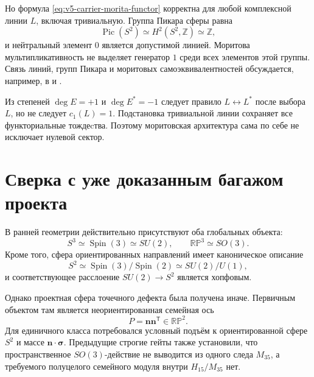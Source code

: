Но формула \eqref{eq:v5-carrier-morita-functor} корректна для любой
комплексной линии $L$, включая тривиальную. Группа Пикара сферы равна
\begin{equation}
 \operatorname{Pic}(S^2)\simeq H^2(S^2,\mathbb Z)\simeq\mathbb Z,
\end{equation}
и нейтральный элемент $0$ является допустимой линией. Моритова
мультипликативность не выделяет генератор $1$ среди всех элементов этой
группы. Связь линий, групп Пикара и моритовых самоэквивалентностей
обсуждается, например, в  и
.

\begin{nogocriterion}
Из степеней $\deg E=+1$ и $\deg E^*=-1$ следует правило
$L\leftrightarrow L^*$ после выбора $L$, но не следует
$c_1(L)=1$. Подстановка тривиальной линии сохраняет все функториальные
тождеcтва. Поэтому моритовская архитектура сама по себе не исключает
нулевой сектор.
\end{nogocriterion}

\section{Сверка с уже доказанным багажом проекта}

В ранней геометрии действительно присутствуют оба глобальных объекта:
\begin{equation}
 S^3\simeq\operatorname{Spin}(3)\simeq SU(2),
 \qquad
 \mathbb{RP}^3\simeq SO(3).
\end{equation}
Кроме того, сфера ориентированных направлений имеет каноническое описание
\begin{equation}
 S^2\simeq\operatorname{Spin}(3)/\operatorname{Spin}(2)
 \simeq SU(2)/U(1),
 \label{eq:v5-spin-direction-sphere}
\end{equation}
и соответствующее расслоение $SU(2)\to S^2$ является хопфовым.

Однако проектная сфера точечного дефекта была получена иначе. Первичным
объектом там является неориентированная семейная ось
\begin{equation}
 P=\mathbf n\mathbf n^{\mathsf T}\in\mathbb{RP}^2.
\end{equation}
Для единичного класса потребовался условный подъём к ориентированной сфере
$S^2$ и массе $\mathbf n\cdot\boldsymbol\sigma$. Предыдущие строгие гейты
также установили, что пространственное $SO(3)$-действие не выводится из
одного следа $M_{35}$, а требуемого полуцелого семейного модуля внутри
$H_{15}/M_{35}$ нет.

